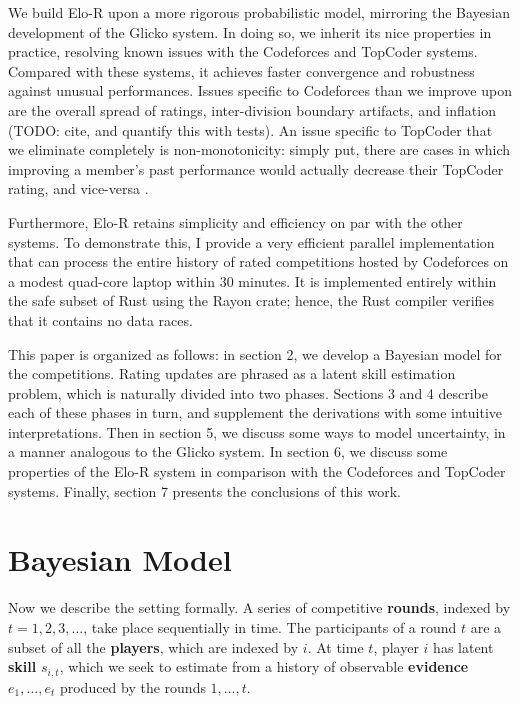 \documentclass{article}
\begin{document}
We build Elo-R upon a more rigorous probabilistic model, mirroring the Bayesian development of the Glicko system. In doing so, we inherit its nice properties in practice, resolving known issues with the Codeforces and TopCoder systems. Compared with these systems, it achieves faster convergence and robustness against unusual performances. Issues specific to Codeforces than we improve upon are the overall spread of ratings, inter-division boundary artifacts, and inflation (TODO: cite, and quantify this with tests). An issue specific to TopCoder that we eliminate completely is non-monotonicity: simply put, there are cases in which improving a member's past performance would actually decrease their TopCoder rating, and vice-versa \cite{forivsektheoretical}.

Furthermore, Elo-R retains simplicity and efficiency on par with the other systems. To demonstrate this, I provide a very efficient parallel implementation that can process the entire history of rated competitions hosted by Codeforces on a modest quad-core laptop within 30 minutes. It is implemented entirely within the safe subset of Rust using the Rayon crate; hence, the Rust compiler verifies that it contains no data races.

This paper is organized as follows: in section 2, we develop a Bayesian model for the competitions. Rating updates are phrased as a latent skill estimation problem, which is naturally divided into two phases. Sections 3 and 4 describe each of these phases in turn, and supplement the derivations with some intuitive interpretations. Then in section 5, we discuss some ways to model uncertainty, in a manner analogous to the Glicko system. In section 6, we discuss some properties of the Elo-R system in comparison with the Codeforces and TopCoder systems. Finally, section 7 presents the conclusions of this work.

\section{Bayesian Model}

Now we describe the setting formally. A series of competitive \textbf{rounds}, indexed by $t=1,2,3,\ldots$, take place sequentially in time. The participants of a round $t$ are a subset of all the \textbf{players}, which are indexed by $i$. At time $t$, player $i$ has latent \textbf{skill} $s_{i,t}$, which we seek to estimate from a history of observable \textbf{evidence} $e_1,\ldots,e_t$ produced by the rounds $1,\ldots,t$.
\end{document}
